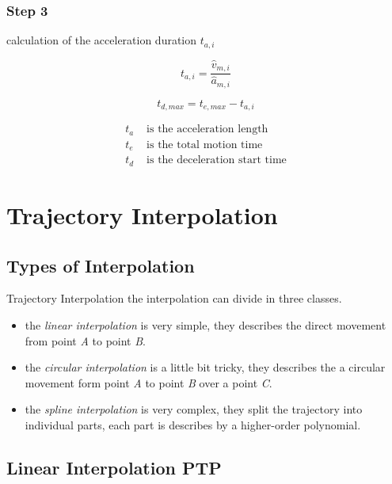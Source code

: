 \documentclass[%
  professionalfonts,%
  xcolor={%
    usenames,%
    dvipsnames,%
    svgnames,%
    table,%
    hyperref%
  }%
]{beamer}
\begin{document}
\subsubsection{Step 3}
\begin{frame}
calculation of the acceleration duration $t_{a,i}$

\begin{equation*}
t_{a,i} = \frac{\hat{v}_{m,i}}{\hat{a}_{m,i}}
\end{equation*}

\begin{equation}
t_{d,max} = t_{e,max}-t_{a,i}
\end{equation}      

\begin{align*}
t_{a} & \text{ is the acceleration length} \\
t_{e} & \text{ is the total motion time} \\
t_{d} & \text{ is the deceleration start time}
\end{align*}
\end{frame}

\section{Trajectory Interpolation}
\subsection{Types of Interpolation}
\begin{frame}{Trajectory Interpolation}
the interpolation can divide in three classes.
\begin{itemize}
\item the \emph{linear interpolation} is very simple, they describes the direct movement from point \emph{A} to point \emph{B}.
\item the \emph{circular interpolation} is a little bit tricky, they describes the a circular movement form point \emph{A} to point \emph{B} over a point \emph{C}.
\item the \emph{spline interpolation} is very complex, they split the trajectory into individual parts, each part is describes by a higher-order polynomial.
\end{itemize}
\end{frame}

\subsection{Linear Interpolation PTP}
%
\end{document}

